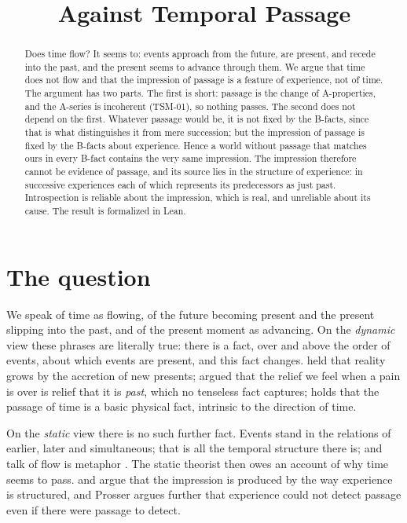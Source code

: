 \documentclass{situationist-preprint}
\title{Against Temporal Passage}
\begin{document}
\maketitle

\begin{abstract}
Does time flow? It seems to: events approach from the future, are present, and recede into the past, and the present seems to advance through them. We argue that time does not flow and that the impression of passage is a feature of experience, not of time. The argument has two parts. The first is short: passage is the change of A-properties, and the A-series is incoherent (TSM-01), so nothing passes. The second does not depend on the first. Whatever passage would be, it is not fixed by the B-facts, since that is what distinguishes it from mere succession; but the impression of passage is fixed by the B-facts about experience. Hence a world without passage that matches ours in every B-fact contains the very same impression. The impression therefore cannot be evidence of passage, and its source lies in the structure of experience: in successive experiences each of which represents its predecessors as just past. Introspection is reliable about the impression, which is real, and unreliable about its cause. The result is formalized in Lean.
\end{abstract}

\section{The question}

We speak of time as flowing, of the future becoming present and the present slipping into the past, and of the present moment as advancing. On the \emph{dynamic} view these phrases are literally true: there is a fact, over and above the order of events, about which events are present, and this fact changes. \citet{Broad1923} held that reality grows by the accretion of new presents; \citet{Prior1959} argued that the relief we feel when a pain is over is relief that it is \emph{past}, which no tenseless fact captures; \citet{Maudlin2007} holds that the passage of time is a basic physical fact, intrinsic to the direction of time.

On the \emph{static} view there is no such further fact. Events stand in the relations of earlier, later and simultaneous; that is all the temporal structure there is; and talk of flow is metaphor \citep{Smart1949,Williams1951}. The static theorist then owes an account of why time seems to pass. \citet{Paul2010} and \citet{Prosser2016} argue that the impression is produced by the way experience is structured, and Prosser argues further that experience could not detect passage even if there were passage to detect.
\end{document}
